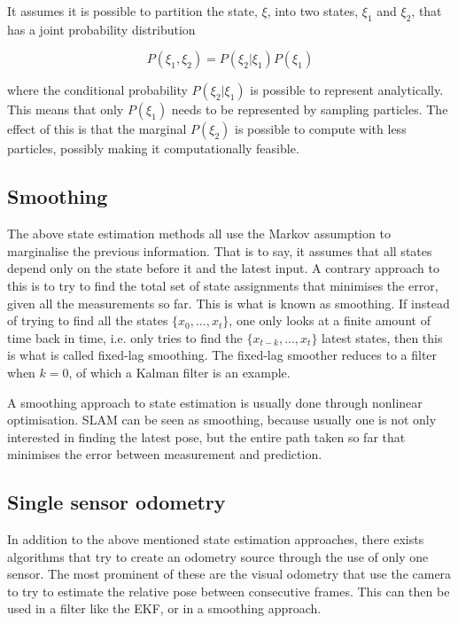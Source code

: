 It assumes it is possible to partition the state, $\xi$, into two states, $\xi_1$ and $\xi_2$, that has a joint probability distribution 

\begin{equation}
    P(\xi_1,\xi_2) = P(\xi_2|\xi_1)P(\xi_1)
\end{equation}

where the conditional probability $P(\xi_2|\xi_1)$ is possible to represent analytically. This means that only $P(\xi_1)$ needs to be represented by sampling particles. The effect of this is that the marginal $P(\xi_2)$ is possible to compute with less particles, possibly making it computationally feasible.

\subsection{Smoothing}

The above state estimation methods all use the Markov assumption to marginalise the previous information. That is to say, it assumes that all states depend only on the state before it and the latest input. A contrary approach to this is to try to find the total set of state assignments that minimises the error, given all the measurements so far. This is what is known as smoothing\cite{SmoothingBook}. If instead of trying to find all the states $\{x_0,\dots,x_t\}$, one only looks at a finite amount of time back in time, i.e. only tries to find the $\{x_{t-k},...,x_{t}\}$ latest states, then this is what is called fixed-lag smoothing. The fixed-lag smoother reduces to a filter when $k=0$, of which a Kalman filter is an example.

A smoothing approach to state estimation is usually done through nonlinear optimisation. SLAM can be seen as smoothing, because usually one is not only interested in finding the latest pose, but the entire path taken so far that minimises the error between measurement and prediction. 

\subsection{Single sensor odometry}

In addition to the above mentioned state estimation approaches, there exists algorithms that try to create an odometry source through the use of only one sensor. The most prominent of these are the visual odometry that use the camera to try to estimate the relative pose between consecutive frames. This can then be used in a filter like the EKF, or in a smoothing approach. 


